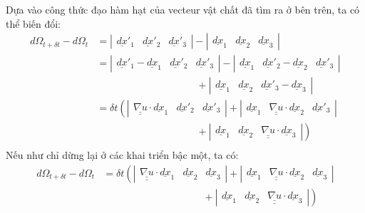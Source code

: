 \documentclass[../../../main.tex]{subfiles}
\begin{document}
	Dựa vào công thức đạo hàm hạt của vecteur vật chất đã tìm ra ở bên trên, ta có thể biến đổi:
		\[
			\begin{aligned}
				d\Omega_{t+\delta t}-d\Omega_{t}&=|\begin{array}{ccc}
					\underline{dx}'_{1} & \underline{dx}'_{2} & \underline{dx}'_{3}\end{array}|-|\begin{array}{ccc}\underline{dx}_{1} & \underline{dx}_{2} & \underline{dx}_{3}\end{array}|\\
					&=|\begin{array}{ccc}\underline{dx}'_{1}-\underline{dx}_{1} & \underline{dx}'_{2} & \underline{dx}'_{3}\end{array}|-|\begin{array}{ccc}\underline{dx}_{1} & \underline{dx}'_{2}-\underline{dx}_{2} & \underline{dx}'_{3}\end{array}|\\
					&\qquad\qquad\qquad\qquad\qquad+|\begin{array}{ccc}
					\underline{dx}_{1} & \underline{dx}_{2} & \underline{dx}'_{3}-\underline{dx}_{3}\end{array}|\\
					&=\delta t\left(|\begin{array}{ccc}\underline{\underline{\nabla u}}\cdot\underline{dx}_{1} & \underline{dx}'_{2} & \underline{dx}'_{3}\end{array}|+|\begin{array}{ccc}\underline{dx}_{1} & \underline{\underline{\nabla u}}\cdot\underline{dx}_{2} & \underline{dx}'_{3}\end{array}|\right.\\
					&\left.\qquad\qquad\qquad\qquad\qquad+|\begin{array}{ccc}\underline{dx}_{1} & \underline{dx}_{2} & \underline{\underline{\nabla u}}\cdot\underline{dx}_{3}\end{array}|\right)\\
			\end{aligned}
		\]
	Nếu như chỉ dừng lại ở các khai triển bậc một, ta có:
	\[
		\begin{aligned}
			d\Omega_{t+\delta t}-d\Omega_{t}&=\delta t\left(|\begin{array}{ccc}\underline{\underline{\nabla u}}\cdot\underline{dx}_{1} & \underline{dx}_{2} & \underline{dx}_{3}\end{array}|+|\begin{array}{ccc}\underline{dx}_{1} & \underline{\underline{\nabla u}}\cdot\underline{dx}_{2} & \underline{dx}_{3}\end{array}|\right.\\
			&\left.\qquad\qquad\qquad\qquad\qquad+|\begin{array}{ccc}\underline{dx}_{1} & \underline{dx}_{2} & \underline{\underline{\nabla u}}\cdot\underline{dx}_{3}\end{array}|\right)
		\end{aligned}
	\]
\end{document}
